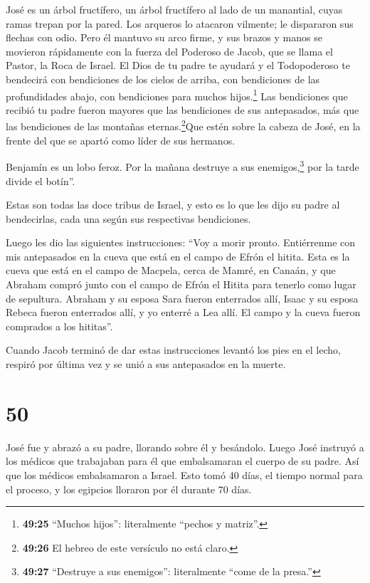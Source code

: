 José es un árbol fructífero, un árbol fructífero al lado
de un manantial, cuyas ramas trepan por la pared.  Los
arqueros lo atacaron vilmente; le dispararon sus flechas con odio.
 Pero él mantuvo su arco firme, y sus brazos y manos se
movieron rápidamente con la fuerza del Poderoso de Jacob, que se llama
el Pastor, la Roca de Israel.  El Dios de tu padre te
ayudará y el Todopoderoso te bendecirá con bendiciones de los cielos de
arriba, con bendiciones de las profundidades abajo, con bendiciones para
muchos hijos.\footnote{\textbf{49:25} ``Muchos hijos'': literalmente
  ``pechos y matriz''.}  Las bendiciones que recibió tu
padre fueron mayores que las bendiciones de sus antepasados, más que las
bendiciones de las montañas eternas.\footnote{\textbf{49:26} El hebreo
  de este versículo no está claro.}Que estén sobre la cabeza de José, en
la frente del que se apartó como líder de sus hermanos.

 Benjamín es un lobo feroz. Por la mañana destruye a sus
enemigos,\footnote{\textbf{49:27} ``Destruye a sus enemigos'':
  literalmente ``come de la presa.''} por la tarde divide el botín''.

 Estas son todas las doce tribus de Israel, y esto es lo
que les dijo su padre al bendecirlas, cada una según sus respectivas
bendiciones.

 Luego les dio las siguientes instrucciones: ``Voy a morir
pronto. Entiérrenme con mis antepasados en la cueva que está en el campo
de Efrón el hitita.  Esta es la cueva que está en el campo
de Macpela, cerca de Mamré, en Canaán, y que Abraham compró junto con el
campo de Efrón el Hitita para tenerlo como lugar de sepultura.
 Abraham y su esposa Sara fueron enterrados allí, Isaac y
su esposa Rebeca fueron enterrados allí, y yo enterré a Lea allí.
 El campo y la cueva fueron comprados a los hititas''.

 Cuando Jacob terminó de dar estas instrucciones levantó
los pies en el lecho, respiró por última vez y se unió a sus antepasados
en la muerte.

\hypertarget{section-49}{%
\section{50}\label{section-49}}

 José fue y abrazó a su padre, llorando sobre él y
besándolo.  Luego José instruyó a los médicos que trabajaban
para él que embalsamaran el cuerpo de su padre. Así que los médicos
embalsamaron a Israel.  Esto tomó 40 días, el tiempo normal
para el proceso, y los egipcios lloraron por él durante 70 días.

